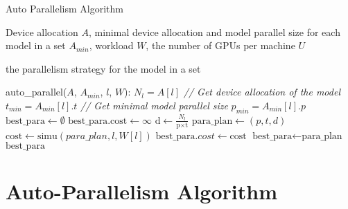\begin{algorithm}[htbp]
\caption{Auto Parallelism Algorithm}
\label{alg:auto_parallel}
\begin{algorithmic}[1]
 Device allocation $A$, minimal device allocation and model parallel size for each model in a set $A_{min}$, workload $W$, the number of GPUs per machine $U$

 the parallelism strategy for the model in a set

 auto\_parallel($A$, $A_{min}$, $l$, $W$):
    \STATE $N_l = A[l]$ \textit{ // Get device allocation of the model}
    \STATE $t_{min} = A_{min}[l].t$ \textit{ // Get minimal model parallel size}
    \STATE $p_{min} = A_{min}[l].p$
    \STATE $\text{best\_para} \leftarrow \emptyset$
    \STATE $\text{best\_para.cost} \leftarrow \infty$
            \STATE $\text{d} \leftarrow \frac{N_l}{\text{p} \times \text{t}}$
            \STATE $\text{para\_plan} \leftarrow (p, t, d)$ 
            \STATE $\text{cost} \leftarrow \text{simu}({para\_plan}, l, W[l])$
                \STATE $\text{best\_para}.cost \leftarrow \text{cost}$
                \STATE $\text{best\_para} \leftarrow \text{para\_plan}$
            \ENDIF
        \ENDFOR
    \ENDFOR
\RETURN $\text{best\_para}$

\end{algorithmic}
\end{algorithm}

\section{Auto-Parallelism Algorithm}  \label{appendix:auto_parallel}

